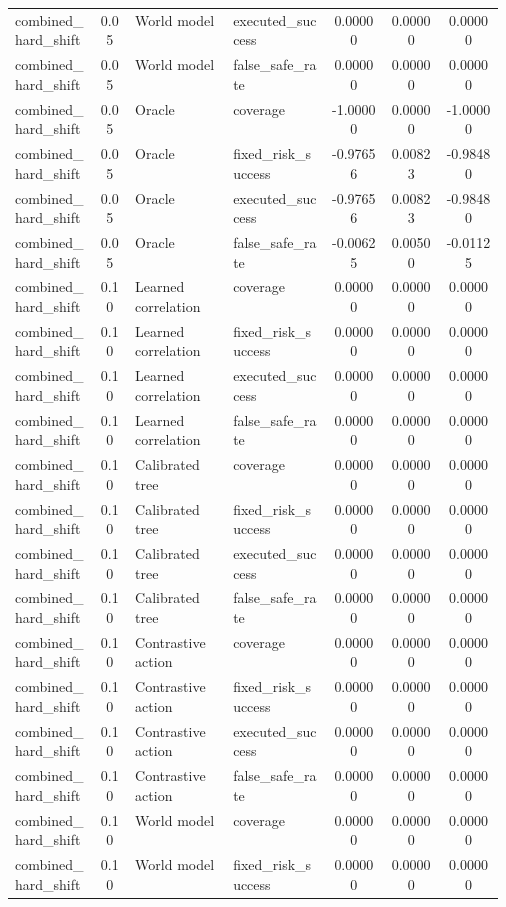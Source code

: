 \documentclass{article}
\begin{document}
\begin{center}
\begin{longtable}{p{0.17\linewidth}cp{0.20\linewidth}p{0.20\linewidth}ccc}
combined\_hard\_shift & 0.05 & World model & executed\_success & 0.00000 & 0.00000 & 0.00000\\
combined\_hard\_shift & 0.05 & World model & false\_safe\_rate & 0.00000 & 0.00000 & 0.00000\\
combined\_hard\_shift & 0.05 & Oracle & coverage & -1.00000 & 0.00000 & -1.00000\\
combined\_hard\_shift & 0.05 & Oracle & fixed\_risk\_success & -0.97656 & 0.00823 & -0.98480\\
combined\_hard\_shift & 0.05 & Oracle & executed\_success & -0.97656 & 0.00823 & -0.98480\\
combined\_hard\_shift & 0.05 & Oracle & false\_safe\_rate & -0.00625 & 0.00500 & -0.01125\\
combined\_hard\_shift & 0.10 & Learned correlation & coverage & 0.00000 & 0.00000 & 0.00000\\
combined\_hard\_shift & 0.10 & Learned correlation & fixed\_risk\_success & 0.00000 & 0.00000 & 0.00000\\
combined\_hard\_shift & 0.10 & Learned correlation & executed\_success & 0.00000 & 0.00000 & 0.00000\\
combined\_hard\_shift & 0.10 & Learned correlation & false\_safe\_rate & 0.00000 & 0.00000 & 0.00000\\
combined\_hard\_shift & 0.10 & Calibrated tree & coverage & 0.00000 & 0.00000 & 0.00000\\
combined\_hard\_shift & 0.10 & Calibrated tree & fixed\_risk\_success & 0.00000 & 0.00000 & 0.00000\\
combined\_hard\_shift & 0.10 & Calibrated tree & executed\_success & 0.00000 & 0.00000 & 0.00000\\
combined\_hard\_shift & 0.10 & Calibrated tree & false\_safe\_rate & 0.00000 & 0.00000 & 0.00000\\
combined\_hard\_shift & 0.10 & Contrastive action & coverage & 0.00000 & 0.00000 & 0.00000\\
combined\_hard\_shift & 0.10 & Contrastive action & fixed\_risk\_success & 0.00000 & 0.00000 & 0.00000\\
combined\_hard\_shift & 0.10 & Contrastive action & executed\_success & 0.00000 & 0.00000 & 0.00000\\
combined\_hard\_shift & 0.10 & Contrastive action & false\_safe\_rate & 0.00000 & 0.00000 & 0.00000\\
combined\_hard\_shift & 0.10 & World model & coverage & 0.00000 & 0.00000 & 0.00000\\
combined\_hard\_shift & 0.10 & World model & fixed\_risk\_success & 0.00000 & 0.00000 & 0.00000\\

\end{longtable}
\end{center}
\end{document}
